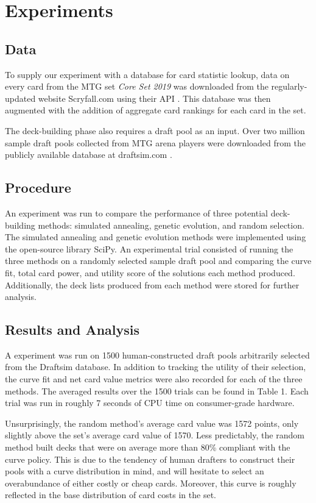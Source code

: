 \documentclass[letterpaper]{article} %
\begin{document}
\section{Experiments}

\subsection{Data}

To supply our experiment with a database for card statistic lookup, data on every card from the MTG set \textit{Core Set 2019} was downloaded from the regularly-updated website Scryfall.com using their API \cite{scryfall}. This database was then augmented with the addition of aggregate card rankings for each card in the set.

The deck-building phase also requires a draft pool as an input. Over two million sample draft pools collected from MTG arena players were downloaded from the publicly available database at draftsim.com \cite{draftsim}. 

\subsection{Procedure}

An experiment was run to compare the performance of three potential deck-building methods: simulated annealing, genetic evolution, and random selection. The simulated annealing and genetic evolution methods were implemented using the open-source library SciPy. An experimental trial consisted of running the three methods on a randomly selected sample draft pool and comparing the curve fit, total card power, and utility score of the solutions each method produced. Additionally, the deck lists produced from each method were stored for further analysis.

\subsection{Results and Analysis}

A experiment was run on 1500 human-constructed draft pools arbitrarily selected from the Draftsim database. In addition to tracking the utility of their selection, the curve fit and net card value metrics were also recorded for each of the three methods. The averaged results over the 1500 trials can be found in Table 1. Each trial was run in roughly 7 seconds of CPU time on consumer-grade hardware.

Unsurprisingly, the random method's average card value was 1572 points, only slightly above the set's average card value of 1570. Less predictably, the random method built decks that were on average more than 80\% compliant with the curve policy. This is due to the tendency of human drafters to construct their pools with a curve distribution in mind, and will hesitate to select an overabundance of either costly or cheap cards. Moreover, this curve is roughly reflected in the base distribution of card costs in the set.
\end{document}
